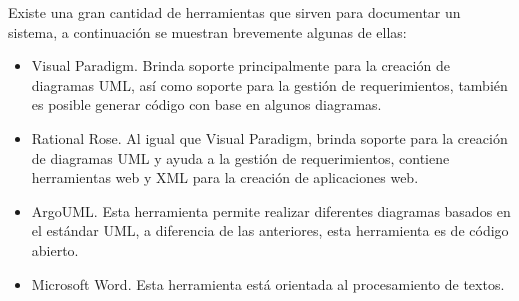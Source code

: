 Existe una gran cantidad de herramientas que sirven para documentar un sistema, a continuación se muestran brevemente algunas de ellas:

\begin{itemize}
	\item Visual Paradigm. Brinda soporte principalmente para la creación de diagramas UML, así como soporte para la gestión de requerimientos, también es posible generar código con base en algunos diagramas.
	\item Rational Rose. Al igual que Visual Paradigm, brinda soporte para la creación de diagramas UML y ayuda a la gestión de requerimientos, contiene herramientas web y XML para la creación de aplicaciones web.
	\item ArgoUML. Esta herramienta permite realizar diferentes diagramas basados en el estándar UML, a diferencia de las anteriores, esta herramienta es de código abierto.
	\item Microsoft Word. Esta herramienta está orientada al procesamiento de textos.
\end{itemize}

